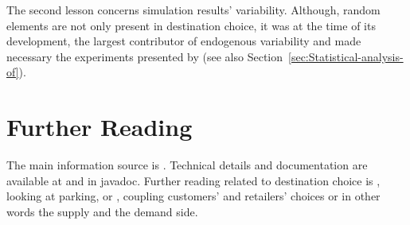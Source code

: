 The second lesson concerns simulation results' variability. 
Although, random elements are not only present in destination choice, it was at the time of its development, the largest contributor of endogenous variability and made necessary the experiments presented by \citet[][]{HorniEtAl_TechRep_IVT_2011_b} (see also Section~\ref{sec:Statistical-analysis-of}).

\section{Further Reading}
The main information source is \citet[][]{HorniEtAl_unpub_TRB_2012, Horni_PhDThesis_2013}. 
Technical details and documentation are available at \citet[][]{MATSIM-T-DC_Webpage_2015} and in \gls{javadoc}. 
Further reading related to destination choice is \citet[][]{HorniEtAl_IATBRspec_2013}, looking at parking, or \citet[][]{HorniEtAl_TechRep_IVT_2012}, coupling customers' and retailers' choices or in other words the supply and the demand side.




